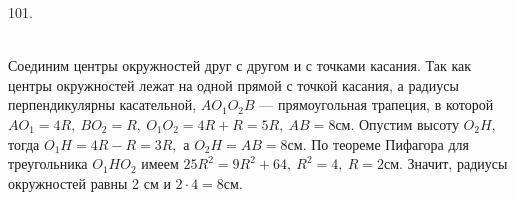 101. \begin{figure}[ht!]
\end{figure}\\
Соединим центры окружностей друг с другом и с точками касания. Так как центры окружностей лежат на одной прямой с точкой касания, а радиусы перпендикулярны касательной, $AO_1O_2B$ --- прямоугольная трапеция, в которой $AO_1=4R,\ BO_2=R,\ O_1O_2=4R+R=5R,\ AB=8$см. Опустим высоту $O_2H,$ тогда $O_1H=4R-R=3R,$ а $O_2H=AB=8$см. По теореме Пифагора для треугольника $O_1HO_2$ имеем $25R^2=9R^2+64,\ R^2=4,\ R=2$см. Значит, радиусы окружностей равны 2 см и $2\cdot4=8$см.\\
